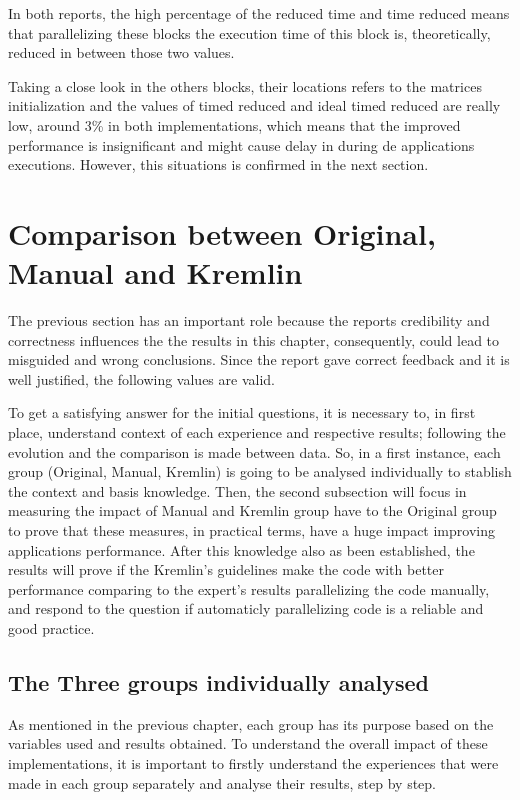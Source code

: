 In both reports, the high percentage of the reduced time and time reduced means that parallelizing these blocks the execution time of this block is, theoretically, reduced in between those two values. 

Taking a close look in the others blocks, their locations refers to the matrices initialization and the values of timed reduced and ideal timed reduced are really low, around 3\% in both implementations, which means that the improved performance is insignificant and might cause delay in during de applications executions. However, this situations is confirmed in the next section. 


\section{Comparison between Original, Manual and Kremlin}\label{sec:compareall}

The previous section has an important role because the reports credibility and correctness influences the the results in this chapter, consequently, could lead to misguided and wrong conclusions. Since the report gave correct feedback and it is well justified, the following values are valid.

To get a satisfying answer for the initial questions, it is necessary to, in first place, understand context of each experience and respective results; following the evolution and the comparison is made between data. So, in a first instance, each group (Original, Manual, Kremlin) is going to be analysed individually to stablish the context and basis knowledge. Then, the second subsection will focus in measuring the impact of Manual and Kremlin group have to the Original group to prove that these measures, in practical terms, have a huge impact improving applications performance. After this knowledge also as been established, the results will prove if the Kremlin's guidelines make the code with better performance comparing to the expert's results parallelizing the code manually, and respond to the question if  automaticly parallelizing code is a reliable and good practice.

\subsection{The Three groups individually analysed}

As mentioned in the previous chapter, each group has its purpose
based on the variables used and results obtained. To understand the overall impact of these implementations, it is important to firstly understand the experiences that were made in each group separately and analyse their results, step by step.

